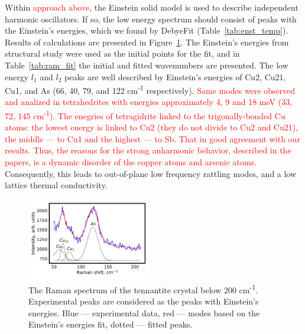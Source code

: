 \documentclass[preprint,review,12pt]{elsarticle}
\begin{document}
Within \textcolor{red}{approach above}, the Einstein solid model is used to describe independent harmonic oscillators.
If so, the low energy spectrum should consist of peaks with the Einstein's energies, which we found by DebyeFit (Table~\ref{tab:enst_temp}).
Results of calculations are presented in Figure~\ref{fig:low_energ_raman}.
The Einstein's energies from structural study were used as the initial points for the fit, and in Table~\ref{tab:ram_fit} the initial  and fitted wavenumbers are presented.
The low energy $l_{1}$ and $l_{2}$ peaks are well described by Einstein's energies of Cu2, Cu21, Cu1, and As (66, 40, 79, and 122 cm\textsuperscript{-1} respectively).
\textcolor{red}{Same modes were observed and analized in tetrahedrites\cite{May2016,Lai2015} with energies approximately 4, 9 and 18 meV (33, 72, 145 cm\textsuperscript{-1}). 
The enegries of tetragidrite linked to the trigonally-bonded Cu atoms: the lowest energy is linked to Cu2 (they do not divide to Cu2 and Cu21), the middle --- to Cu1 and the highest --- to Sb. That in good agreement with our results.
Thus, the reasons for the strong anharmonic behavior, described in the papers, is a dynamic disorder of the copper atoms and arsenic atoms.}
Consequently, this leads to out-of-plane low frequency rattling modes, and a low lattice thermal conductivity.


\begin{table}
\caption{\label{tab:ram_fit}
Initial and fitted Einstein's energies. Initial energies are Einstein's energies from structural study.}
\centering
{}
\end{table}

\begin{figure}
\centering
\includegraphics[width=0.48\textwidth]{raman_25_CuAsS3_low_energy}
\caption{\label{fig:low_energ_raman} The Raman spectrum of the tennantite crystal  below 200 cm\textsuperscript{-1}. Experimental peaks are considered as the peaks with Einstein's energies. Blue --- experimental data, red --- modes based on the Einstein's energies fit, dotted --- fitted peaks.}
\end{figure}
\end{document}
